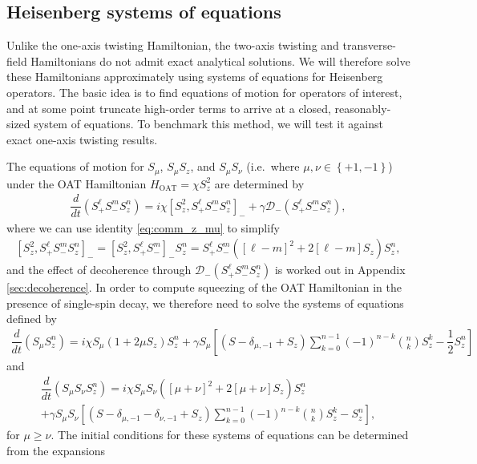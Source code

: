 \documentclass[aps,notitlepage,nofootinbib,11pt]{revtex4-1}
\renewcommand{\t}{\text} %
\newcommand{\f}[2]{\dfrac{#1}{#2}} %
\newcommand{\p}[1]{\left(#1\right)} %
\renewcommand{\sp}[1]{\left[#1\right]} %
\renewcommand{\set}[1]{\left\{#1\right\}} %
\newcommand{\D}{\mathcal{D}}
\newcommand{\1}{\mathds{1}}
\begin{document}
\subsection{Heisenberg systems of equations}

Unlike the one-axis twisting Hamiltonian, the two-axis twisting and
transverse-field Hamiltonians do not admit exact analytical
solutions. We will therefore solve these Hamiltonians approximately
using systems of equations for Heisenberg operators.  The basic idea
is to find equations of motion for operators of interest, and at some
point truncate high-order terms to arrive at a closed,
reasonably-sized system of equations.  To benchmark this method, we
will test it against exact one-axis twisting results.

The equations of motion for $S_\mu$, $S_\mu S_z$, and $S_\mu S_\nu$
(i.e.~where $\mu,\nu\in\set{+1,-1}$) under the OAT Hamiltonian
$H_{\t{OAT}}=\chi S_z^2$ are determined by
\begin{align}
  \f{d}{dt} \p{S_+^\ell S_-^m S_z^n}
  = i\chi \sp{S_z^2, S_+^\ell S_-^m S_z^n}_-
  + \gamma \D_-\p{S_+^\ell S_-^m S_z^n},
\end{align}
where we can use identity \eqref{eq:comm_z_mu} to simplify
\begin{align}
  \sp{S_z^2, S_+^\ell S_-^m S_z^n}_-
  = \sp{S_z^2, S_+^\ell S_-^m}_- S_z^n
  = S_+^\ell S_-^m \p{\sp{\ell-m}^2 + 2\sp{\ell-m} S_z} S_z^n,
  \label{eq:S_z^2_comm}
\end{align}
and the effect of decoherence through $\D_-\p{S_+^\ell S_-^m S_z^n}$ is
worked out in Appendix \ref{sec:decoherence}.  In order to compute
squeezing of the OAT Hamiltonian in the presence of single-spin decay,
we therefore need to solve the systems of equations defined by
\begin{align}
  \f{d}{dt} \p{S_\mu S_z^n}
  = i\chi S_\mu \p{1 + 2\mu S_z} S_z^n
  + \gamma S_\mu \sp{\p{S - \delta_{\mu,-1} + S_z} \sum_{k=0}^{n-1}
    \p{-1}^{n-k} { n \choose k } S_z^k - \f12 S_z^n}
\end{align}
and
\begin{multline}
  \f{d}{dt} \p{S_\mu S_\nu S_z^n}
  = i\chi S_\mu S_\nu \p{\sp{\mu+\nu}^2 + 2 \sp{\mu+\nu} S_z} S_z^n \\
  + \gamma S_\mu S_\nu
  \sp{\p{S - \delta_{\mu,-1} - \delta_{\nu,-1} + S_z} \sum_{k=0}^{n-1}
    \p{-1}^{n-k} { n \choose k } S_z^k - S_z^n},
\end{multline}
for $\mu\ge\nu$.  The initial conditions for these systems of equations can be determined from the expansions
\end{document}
